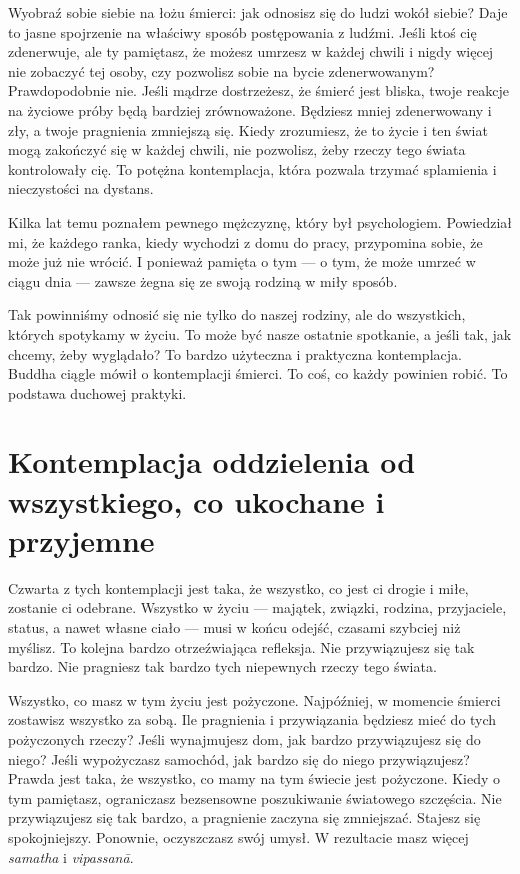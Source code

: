 \documentclass[12pt,openany]{book}
\begin{document}
Wyobraź sobie siebie na łożu śmierci: jak odnosisz się do ludzi wokół siebie? Daje to jasne spojrzenie na właściwy sposób postępowania z ludźmi. Jeśli ktoś cię zdenerwuje, ale ty pamiętasz, że możesz umrzesz w każdej chwili i nigdy więcej nie zobaczyć tej osoby, czy pozwolisz sobie na bycie zdenerwowanym? Prawdopodobnie nie. Jeśli mądrze dostrzeżesz, że śmierć jest bliska, twoje reakcje na życiowe próby będą bardziej zrównoważone. Będziesz mniej zdenerwowany i zły, a twoje pragnienia zmniejszą się. Kiedy zrozumiesz, że to życie i ten świat mogą zakończyć się w każdej chwili, nie pozwolisz, żeby rzeczy tego świata kontrolowały cię. To potężna kontemplacja, która pozwala trzymać splamienia i nieczystości na dystans.

Kilka lat temu poznałem pewnego mężczyznę, który był psychologiem. Powiedział mi, że każdego ranka, kiedy wychodzi z domu do pracy, przypomina sobie, że może już nie wrócić. I ponieważ pamięta o tym --- o tym, że może umrzeć w ciągu dnia --- zawsze żegna się ze swoją rodziną w miły sposób.

Tak powinniśmy odnosić się nie tylko do naszej rodziny, ale do wszystkich, których spotykamy w życiu. To może być nasze ostatnie spotkanie, a jeśli tak, jak chcemy, żeby wyglądało? To bardzo użyteczna i praktyczna kontemplacja. Buddha ciągle mówił o kontemplacji śmierci. To coś, co każdy powinien robić. To podstawa duchowej praktyki.

\section*{Kontemplacja oddzielenia od wszystkiego, co ukochane i przyjemne}

Czwarta z tych kontemplacji jest taka, że wszystko, co jest ci drogie i miłe, zostanie ci odebrane. Wszystko w życiu --- majątek, związki, rodzina, przyjaciele, status, a nawet własne ciało --- musi w końcu odejść, czasami szybciej niż myślisz. To kolejna bardzo otrzeźwiająca refleksja. Nie przywiązujesz się tak bardzo. Nie pragniesz tak bardzo tych niepewnych rzeczy tego świata.

Wszystko, co masz w tym życiu jest pożyczone. Najpóźniej, w momencie śmierci zostawisz wszystko za sobą. Ile pragnienia i przywiązania będziesz mieć do tych pożyczonych rzeczy? Jeśli wynajmujesz dom, jak bardzo przywiązujesz się do niego? Jeśli wypożyczasz samochód, jak bardzo się do niego przywiązujesz? Prawda jest taka, że wszystko, co mamy na tym świecie jest pożyczone. Kiedy o tym pamiętasz, ograniczasz bezsensowne poszukiwanie światowego szczęścia. Nie przywiązujesz się tak bardzo, a pragnienie zaczyna się zmniejszać. Stajesz się spokojniejszy. Ponownie, oczyszczasz swój umysł. W rezultacie masz więcej \textit{samatha} i \textit{vipassanā}.
\end{document}
